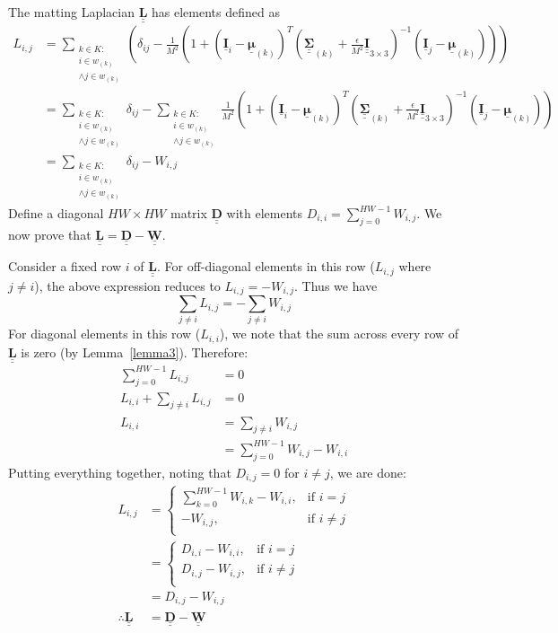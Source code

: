 \documentclass{article}
\theoremstyle{definition}
\def\vt#1{\underline{\mathbf{#1}}}
\def\vts#1{\underline{\boldsymbol{#1}}}
\def\mt#1{\underline{\underline{\mathbf{#1}}}}
\def\mts#1{\underline{\underline{\boldsymbol{#1}}}}
\begin{document}
The matting Laplacian $\mt L$ has elements defined as
\begin{align*}
    L_{i,j} &= \sum_{\substack{k\in K:\\i\in w_{(k)}\\ \wedge j\in w_{(k)}}} \left( \delta_{ij} - \frac1{M^2}\left(1 + \left(\vt{I}_i - \vts \mu_{(k)}\right)^T \left(\mts \Sigma_{(k)} + \frac\epsilon{M^2} \mt{I}_{3\times 3}\right)^{-1} \left(\vt{I}_j - \vts
\mu_{(k)}\right) \right) \right) \\
    &= \sum_{\substack{k\in K:\\i\in w_{(k)}\\ \wedge j\in w_{(k)}}} \delta_{ij} - \sum_{\substack{k\in K:\\i\in w_{(k)} \\\wedge j\in w_{(k)}}} \frac1{M^2} \left(1 + \left(\vt{I}_i - \vts \mu_{(k)}\right)^T \left(\mts \Sigma_{(k)} + \frac\epsilon{M^2} \mt{I}_{3\times 3}\right)^{-1} \left(\vt{I}_j - \vts
    \mu_{(k)}\right) \right) \\
    &= \sum_{\substack{k\in K:\\i\in w_{(k)} \\\wedge j\in w_{(k)}}} \delta_{ij} -  W_{i,j}
\end{align*}
Define a diagonal $HW\times HW$ matrix $\mt D$ with elements $D_{i,i} = \sum_{j=0}^{HW-1} W_{i,j}$. We now prove that $\mt L = \mt D - \mt W$.

Consider a fixed row $i$ of $\mt L$. For off-diagonal elements in this row ($L_{i,j}$ where $j\neq i$), the above expression reduces to $L_{i,j} = -W_{i,j}$. Thus we have
$$\sum_{j\neq i} L_{i,j} = -\sum_{j\neq i} W_{i,j}$$
For diagonal elements in this row ($L_{i,i}$), we note that the sum across every row of $\mt L$ is zero (by Lemma~\ref{lemma3}). Therefore:
\begin{align*}
    \sum_{j=0}^{HW-1} L_{i,j} &= 0\\
    L_{i,i} + \sum_{j\neq i} L_{i,j} &= 0\\
    L_{i,i} &= \sum_{j\neq i} W_{i,j}\\
    &= \sum_{j=0}^{HW-1} W_{i,j} - W_{i,i}
\end{align*}
Putting everything together, noting that $D_{i,j}=0$ for $i\neq j$, we are done:
\begin{align*}
    L_{i,j} &= \begin{cases}
        \sum_{k=0}^{HW-1} W_{i,k} - W_{i,i},&\text{if $i=j$}\\
        - W_{i,j},&\text{if $i\neq j$}\\
    \end{cases} \\
    &= \begin{cases}
        D_{i,i} - W_{i,i},&\text{if $i=j$}\\
        D_{i,j} - W_{i,j},&\text{if $i\neq j$}\\
    \end{cases}\\
    &= D_{i,j} - W_{i,j}\\
    \therefore \mt L &= \mt D - \mt W
\end{align*}
\end{document}
